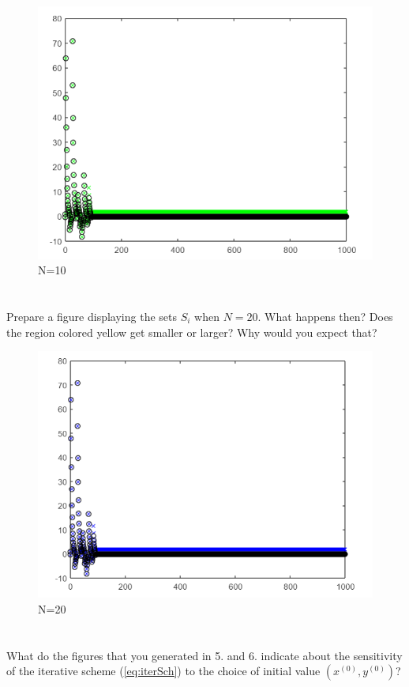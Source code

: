 \documentclass{article}
\begin{document}
\begin{figure}[H]
    \centering
    \includegraphics[width=.75\linewidth]{images/hw03q05.PNG}
    \caption{N=10}
    \label{fig:question5 n=10}
\end{figure}

\section{}
Prepare a figure displaying the sets $S_i$ when $N=20$. What happens then? Does the region colored yellow get smaller or larger? Why would you expect that?
\vspace{10mm}

\begin{figure}[H]
    \centering
    \includegraphics[width=.75\linewidth]{images/hw03q06.PNG}
    \caption{N=20}
    \label{fig:question6 n=20}
\end{figure}
\section{}
What do the figures that you generated in 5. and 6. indicate about the sensitivity of the iterative scheme (\ref{eq:iterSch}) to the choice of initial value $(x^{(0)},y^{(0)})$?
\vspace{10mm}
\end{document}
